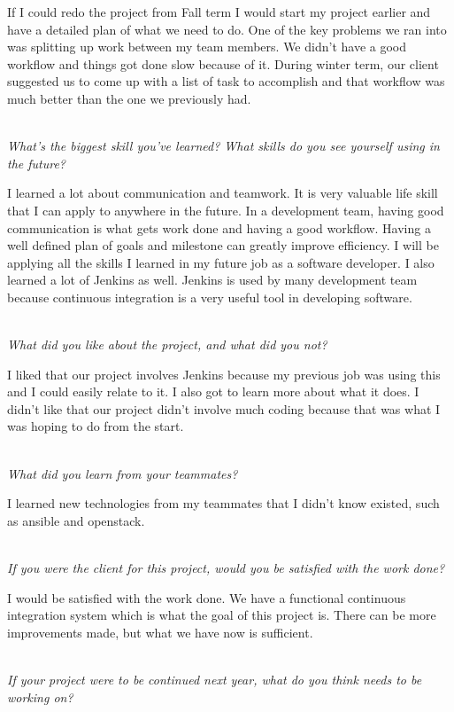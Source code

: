 \documentclass[10pt,letterpaper,onecolumn,draftclsnofoot]{IEEEtran}
\begin{document}
If I could redo the project from Fall term I would start my project earlier and have a detailed plan of what we need to do. One of the key problems we ran into was splitting up work between my team members. We didn't have a good workflow and things got done slow because of it. During winter term, our client suggested us to come up with a list of task to accomplish and that workflow was much better than the one we previously had.

\textit{\\What's the biggest skill you've learned? What skills do you see yourself using in the future?}

I learned a lot about communication and teamwork. It is very valuable life skill that I can apply to anywhere in the future. In a development team, having good communication is what gets work done and having a good workflow. Having a well defined plan of goals and milestone can greatly improve efficiency. I will be applying all the skills I learned in my future job as a software developer. I also learned a lot of Jenkins as well. Jenkins is used by many development team because continuous integration is a very useful tool in developing software.

\textit{\\What did you like about the project, and what did you not?}

I liked that our project involves Jenkins because my previous job was using this and I could easily relate to it. I also got to learn more about what it does. I didn't like that our project didn't involve much coding because that was what I was hoping to do from the start.

\textit{\\What did you learn from your teammates?}

I learned new technologies from my teammates that I didn't know existed, such as ansible and openstack.

\textit{\\If you were the client for this project, would you be satisfied with the work done?}

I would be satisfied with the work done. We have a functional continuous integration system which is what the goal of this project is. There can be more improvements made, but what we have now is sufficient.

\textit{\\If your project were to be continued next year, what do you think needs to be working on?}
\end{document}
